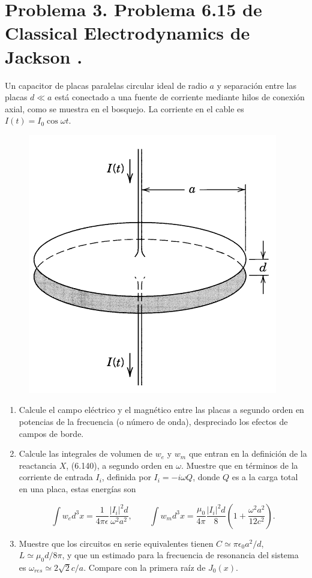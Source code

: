 \documentclass[a4paper,11pt]{article}
\numberwithin{equation}{section}
\begin{document}
\newpage

\section{Problema 3. Problema 6.15 de Classical Electrodynamics
de Jackson \cite{jackson}.}

Un capacitor de placas paralelas circular ideal de radio $a$ y separación entre 
las placas $d \ll a$ está conectado a una fuente de corriente mediante hilos de 
conexión axial, como se muestra en el bosquejo. La corriente en el cable es 
$I(t) = I_0\cos{\omega t}$.

\begin{figure}[H]
 \center 
 \includegraphics[scale=0.5]{problema3fig1}
\end{figure}

\begin{enumerate}[label=\textbf{(\alph*)}]
\item Calcule el campo eléctrico y el magnético entre las placas a segundo orden 
en potencias de la frecuencia (o número de onda), despreciado los efectos de campos 
de borde.
\item Calcule las integrales de volumen de $w_e$ y $w_m$ que entran en la definición 
de la reactancia $X$, (6.140), a segundo orden en $\omega$. Muestre que en términos 
de la corriente de entrada $I_i$, definida por $I_i = - i\omega Q$, donde $Q$ es 
a la carga total en una placa, estas energías son 

$$
\int w_e d^3x = \frac{1}{4\pi\epsilon}\frac{|I_i|^2d}{\omega^2 a^2}, \qquad 
\int w_m d^3x = \frac{\mu_0}{4\pi}\frac{|I_i|^2d}{8}\left(1 +
\frac{\omega^2 a^2}{12c^2} \right).
$$
\item Muestre que los circuitos en serie equivalentes tienen $C \simeq \pi\epsilon_0 
a^2/d$, $L \simeq \mu_0d/8\pi$, y que un estimado para la frecuencia de resonancia 
del sistema es $\omega_{res} \simeq 2\sqrt{2}c/a$. Compare con la primera raíz 
de $J_0(x)$.
\end{enumerate}
\end{document}
